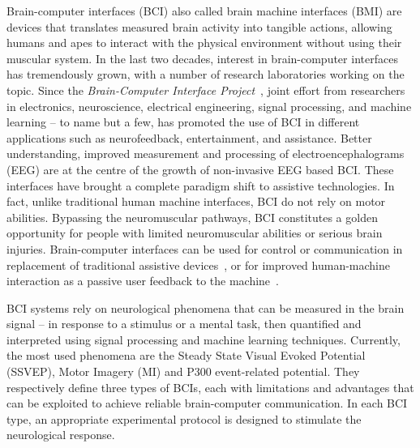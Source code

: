 Brain-computer interfaces (BCI) also called brain machine interfaces (BMI) are devices that translates measured brain activity into tangible actions, allowing humans and apes to interact with the physical environment without using their muscular system.
In the last two decades, interest in brain-computer interfaces has tremendously grown, with a number of research laboratories working on the topic. 
Since the \emph{Brain-Computer Interface Project}~\citep{vidal_toward_1973}, joint effort from researchers in electronics, neuroscience, electrical engineering, signal processing, and machine learning -- to name but a few, has promoted the use of BCI in different applications such as neurofeedback, entertainment, and assistance. 
Better understanding, improved measurement and processing of electroencephalograms (EEG) are at the centre of the growth of non-invasive EEG based BCI. 
These interfaces have brought a complete paradigm shift to assistive technologies. 
In fact, unlike traditional human machine interfaces, BCI do not rely on motor abilities. 
Bypassing the neuromuscular pathways, BCI constitutes a golden opportunity for people with limited neuromuscular abilities or serious brain injuries. Brain-computer interfaces can be used for control or communication in replacement of traditional assistive devices~\citep{wolpaw_brain-computer_2002}, or for improved human-machine interaction as a passive user feedback to the machine~\citep{zander_towards_2011}.

BCI systems rely on neurological phenomena that can be measured in the brain signal -- in response to a stimulus or a mental task, then quantified and interpreted using signal processing and machine learning techniques.
Currently, the most used phenomena are the Steady State Visual Evoked Potential (SSVEP), Motor Imagery (MI) and P300 event-related potential. 
They respectively define three types of BCIs, each with limitations and advantages that can be exploited to achieve reliable brain-computer communication.  
In each BCI type, an appropriate experimental protocol is designed to stimulate the neurological response. 

